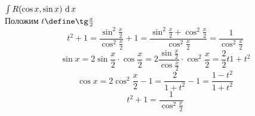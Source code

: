 \begin{statement}
    $ \int {R(\cos x, \sin x)} \, \operatorname{d} {x} $ \\
    Положим $ t \define \tg \frac{x}2 $
    $$ t^2 + 1 = \frac{\sin^2 \frac{x}2}{\cos^2 \frac{x}2} + 1 = \frac{\sin^2 \frac{x}2 + \cos^2 \frac{x}2}{\cos^2 \frac{x}2} = \frac1{\cos^2 \frac{x}2} $$
    $$ \sin x = 2 \sin \frac{x}2 \cdot \cos \frac{x}2 = 2 \frac{\sin \frac{x}2}{ \cos \frac{x}2} \cdot \cos^2 \frac{x}2 = \frac22t{1 + t^2} $$
    $$ \cos x = 2 \cos^2 \frac{x}2 - 1 = \frac{2}{1 + t^2} - 1 = \frac{1 - t^2}{1 + t^2} $$
    $$ t^2 + 1 = \frac1{\cos^2  \frac{x}2} $$
\end{statement}
